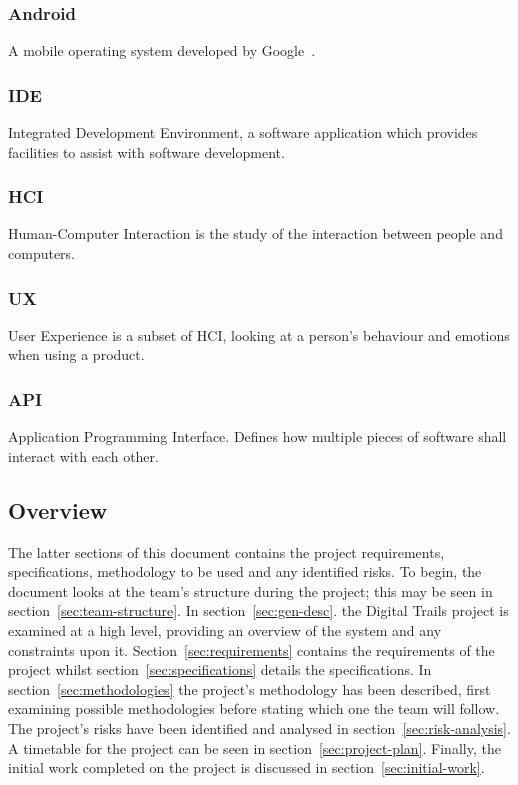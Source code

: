 \documentclass[11pt,a4paper]{article}
\begin{document}
\subsubsection{Android}
A mobile operating system developed by Google~\cite{android}. 

\subsubsection{IDE}
Integrated Development Environment, a software application which provides facilities to assist with software development.

\subsubsection{HCI}
Human-Computer Interaction is the study of the interaction between people and computers.

\subsubsection{UX}
User Experience is a subset of HCI, looking at a person's behaviour and emotions when using a product.

\subsubsection{API}
Application Programming Interface. Defines how multiple pieces of software shall interact with each other.

\subsection{Overview}
The latter sections of this document contains the project requirements, specifications, methodology to be used and any identified risks. To begin, the document looks at the team's structure during the project; this may be seen in section~\ref{sec:team-structure}. In section~\ref{sec:gen-desc}. the Digital Trails project is examined at a high level, providing an overview of the system and any constraints upon it. Section~\ref{sec:requirements} contains the requirements of the project whilst section~\ref{sec:specifications} details the specifications. In section~\ref{sec:methodologies} the project's methodology has been described, first examining possible methodologies before stating which one the team will follow. The project's risks have been identified and analysed in section~\ref{sec:risk-analysis}. A timetable for the project can be seen in section~\ref{sec:project-plan}. Finally, the initial work completed on the project is discussed in section~\ref{sec:initial-work}.
\end{document}
